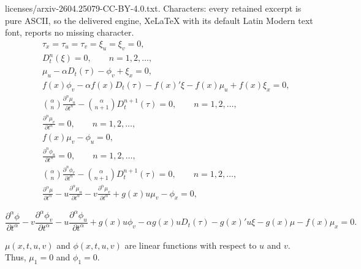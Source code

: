 \documentclass[10pt,a4paper]{amsart}
\begin{document}
licenses/arxiv-2604.25079-CC-BY-4.0.txt. Characters: every retained excerpt is pure ASCII, so the delivered engine, XeLaTeX with its default Latin Modern text font, reports no missing character.
\begin{eqnarray}
& & \tau_x=\tau_u=\tau_v=\xi_u=\xi_v=0,\label{aneg}\\
& & D_t^n(\xi)=0,\qquad n=1,2,\ldots,\label{gurav}\\
& & \mu_u-\alpha D_t(\tau)-\phi_v+\xi_x=0,\label{duruv}\\
& & f(x)\phi_v-\alpha f(x) D_t(\tau)-f(x)'\xi-f(x)\mu_u+f(x)\xi_x=0,\label{es}\\
& & \binom{\alpha}{n}\frac{\partial^n\mu_u}{\partial t^n}-\binom{\alpha}{n+1}D_t^{n+1}(\tau)=0,\qquad n=1,2,\ldots,\label{neg}\\
& & \frac{\partial^n\mu_v}{\partial t^n}=0,\qquad n=1,2,\ldots,\label{hoyor}\\
& & f(x)\mu_v-\phi_u=0,\label{tav}\\
& & \frac{\partial^n\phi_u}{\partial t^n}=0,\qquad n=1,2,\ldots,\label{doloo}\\
& & \binom{\alpha}{n}\frac{\partial^n\phi_v}{\partial t^n}-\binom{\alpha}{n+1}D_t^{n+1}(\tau)=0,\qquad n=1,2,\ldots,\label{naim}\\
& & \frac{\partial^\alpha\mu}{\partial t^\alpha}-u\frac{\partial^\alpha\mu_u}{\partial t^\alpha}-v\frac{\partial^\alpha\mu_v}{\partial t^\alpha}+g(x)u\mu_v-\phi_x=0,\label{zurgaa}
\end{eqnarray}

\begin{equation}\label{arav}
\frac{\partial^\alpha\phi}{\partial t^\alpha}-v\frac{\partial^\alpha\phi_v}{\partial t^\alpha}-u\frac{\partial^\alpha\phi_u}{\partial t^\alpha}+g(x)u\phi_v-\alpha g(x)uD_t(\tau)-g(x)'u\xi-g(x)\mu-f(x)\mu_x=0.
\end{equation}

\begin{lemma} \label{lemma:linear_inf}
 $\mu(x,t,u,v)$ and $\phi(x,t,u,v)$ are linear functions with respect to $u$ and $v$. Thus, $\mu_1=0$ and $\phi_1=0$.
\end{lemma}
\end{document}
